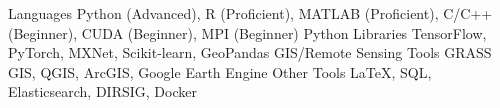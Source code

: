 \documentclass{tidycv} %
\begin{document}

\begin{cvhonors}
	
\end{cvhonors}






\begin{cvtechnicalstrengths}
  \cvtechnicalstrength
  {Languages} %
  {Python (Advanced), R (Proficient), MATLAB (Proficient), C/C++ (Beginner), CUDA (Beginner), MPI (Beginner) } %
  \cvtechnicalstrength
  {Python Libraries} %
  {TensorFlow, PyTorch, MXNet, Scikit-learn, GeoPandas} %
   \cvtechnicalstrength
  {GIS/Remote Sensing Tools} %
  {GRASS GIS, QGIS, ArcGIS, Google Earth Engine} %
   \cvtechnicalstrength
  {Other Tools} %
  {LaTeX, SQL, Elasticsearch, DIRSIG, Docker} %
\end{cvtechnicalstrengths}
\end{document}

